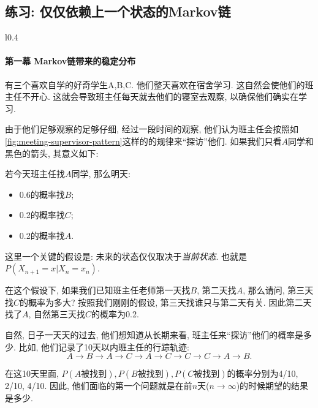     \subsection{练习: 仅仅依赖上一个状态的Markov链}

        \begin{wrapfigure}{l}{0.4\textwidth}
        \begin{center}
            
        \end{center}
        \caption{班主任探访的规律}
        \label{fig:meeting-supervisor-pattern}
    \end{wrapfigure}
    \paragraph{第一幕 Markov链带来的稳定分布} 有三个喜欢自学的好奇学生A,B,C. 他们整天喜欢在宿舍学习. 这自然会使他们的班主任不开心. 这就会导致班主任每天就去他们的寝室去观察, 以确保他们确实在学习. 
    
    由于他们足够观察的足够仔细, 经过一段时间的观察, 他们认为班主任会按照如\cref{fig:meeting-supervisor-pattern}这样的的规律来``探访''他们.  如果我们只看$A$同学和黑色的箭头, 其意义如下: 

    若今天班主任找$A$同学, 那么明天: 
    \begin{itemize}
        \item 0.6的概率找$B$;
        \item 0.2的概率找$C$;
        \item 0.2的概率找$A$.
    \end{itemize}

    这里一个关键的假设是: 未来的状态仅仅取决于\emph{当前状态}. 也就是$P(X_{n+1}=x|X_n=x_n)$.
    
    在这个假设下, 如果我们已知班主任老师第一天找$B$, 第二天找$A$, 那么请问, 第三天找$C$的概率为多大? 按照我们刚刚的假设, 第三天找谁只与第二天有关. 因此第二天找了$A$, 自然第三天找$C$的概率为0.2. 

    自然, 日子一天天的过去, 他们想知道从长期来看, 班主任来``探访''他们的概率是多少. 比如, 他们记录了10天以内班主任的行踪轨迹: 
    $$
    A \to B \to A\to C \to A \to C\to C\to C\to A\to B.
    $$

    在这10天里面, $P(A\text{被找到}), P(B\text{被找到}),P(C\text{被找到})$的概率分别为4/10, 2/10, 4/10. 因此, 他们面临的第一个问题就是在前$n$天($n\to \infty$)的时候期望的结果是多少. 

